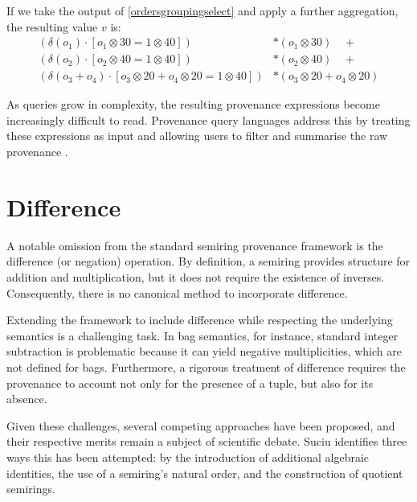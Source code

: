 \documentclass[oneside, 11pt]{amsbook}
\theoremstyle{plain}
\theoremstyle{definition}
\theoremstyle{remark}
\begin{document}
\begin{exmpl}
    If we take the output of \autoref{ordersgroupingselect} and apply a further aggregation, the resulting value $v$ is:
    \[
        \begin{aligned}
            (\delta(o_1) \cdot [o_1 \otimes 30 = 1 \otimes 40])                        & \ast (o_1 \otimes 30) \quad +          \\
            (\delta(o_2) \cdot [o_2 \otimes 40 = 1 \otimes 40])                        & \ast (o_2 \otimes 40) \quad +          \\
            (\delta(o_3 + o_4) \cdot [o_3 \otimes 20 + o_4 \otimes 20 = 1 \otimes 40]) & \ast (o_3 \otimes 20 + o_4 \otimes 20)
        \end{aligned}
    \]
\end{exmpl}

As queries grow in complexity, the resulting provenance expressions become increasingly difficult to read. Provenance query languages address this by treating these expressions as input and allowing users to filter and summarise the raw provenance \cite{Karvounarakis2010}.

\chapter{Difference}
\label{chapter:difference}

A notable omission from the standard semiring provenance framework is the difference (or negation) operation. By definition, a semiring provides structure for addition and multiplication, but it does not require the existence of inverses. Consequently, there is no canonical method to incorporate difference.

Extending the framework to include difference while respecting the underlying semantics is a challenging task. In bag semantics, for instance, standard integer subtraction is problematic because it can yield negative multiplicities, which are not defined for bags. Furthermore, a rigorous treatment of difference requires the provenance to account not only for the presence of a tuple, but also for its absence.

Given these challenges, several competing approaches have been proposed, and their respective merits remain a subject of scientific debate. Suciu \cite{Suciu2024} identifies three ways this has been attempted: by the introduction of additional algebraic identities, the use of a semiring's natural order, and the construction of quotient semirings.
\end{document}
